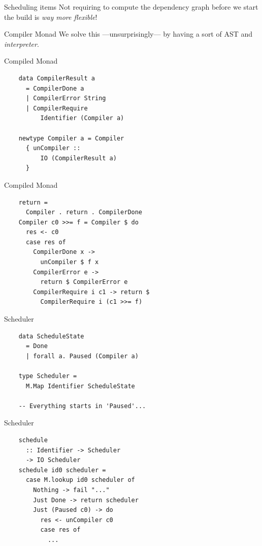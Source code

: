 \documentclass[20pt]{beamer}
\begin{document}
\begin{frame}{Scheduling items}
    Not requiring to compute the dependency graph before we start the build is
    \emph{way more flexible}!
\end{frame}

\begin{frame}{Compiler Monad}
    We solve this ---unsurprisingly--- by having a sort of AST and
    \emph{interpreter}.
\end{frame}

\begin{frame}[fragile]{Compiled Monad}
    \begin{lstlisting}
    data CompilerResult a
      = CompilerDone a
      | CompilerError String
      | CompilerRequire
          Identifier (Compiler a)

    newtype Compiler a = Compiler
      { unCompiler ::
          IO (CompilerResult a)
      }
    \end{lstlisting}
\end{frame}

\begin{frame}[fragile]{Compiled Monad}
    \begin{lstlisting}
    return =
      Compiler . return . CompilerDone
    Compiler c0 >>= f = Compiler $ do
      res <- c0
      case res of
        CompilerDone x ->
          unCompiler $ f x
        CompilerError e ->
          return $ CompilerError e
        CompilerRequire i c1 -> return $
          CompilerRequire i (c1 >>= f)
    \end{lstlisting}
\end{frame}

\begin{frame}[fragile]{Scheduler}
    \begin{lstlisting}
    data ScheduleState
      = Done
      | forall a. Paused (Compiler a)

    type Scheduler =
      M.Map Identifier ScheduleState

    -- Everything starts in 'Paused'...

    \end{lstlisting}
\end{frame}

\begin{frame}[fragile]{Scheduler}
    \begin{lstlisting}
    schedule
      :: Identifier -> Scheduler
      -> IO Scheduler
    schedule id0 scheduler =
      case M.lookup id0 scheduler of
        Nothing -> fail "..."
        Just Done -> return scheduler
        Just (Paused c0) -> do
          res <- unCompiler c0
          case res of
            ...
    \end{lstlisting}
\end{frame}
\end{document}
